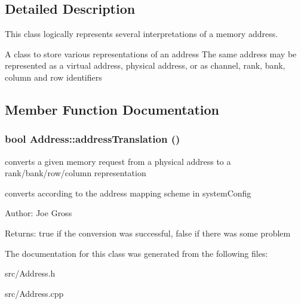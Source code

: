 \subsection{Detailed Description}
This class logically represents several interpretations of a memory address. 

A class to store various representations of an address The same address may be represented as a virtual address, physical address, or as channel, rank, bank, column and row identifiers 

\subsection{Member Function Documentation}
\subsubsection[{addressTranslation}]{\setlength{\rightskip}{0pt plus 5cm}bool Address::addressTranslation ()\hspace{0.3cm}{\tt  [protected]}}\label{class_d_r_a_msim_i_i_1_1_address_d4039f830c5947b91ceb40b8c54503bc}


converts a given memory request from a physical address to a rank/bank/row/column representation 

converts according to the address mapping scheme in systemConfig \begin{Desc}
\item[Author:]Joe Gross \end{Desc}
\begin{Desc}
\item[Returns:]true if the conversion was successful, false if there was some problem \end{Desc}


The documentation for this class was generated from the following files:\begin{CompactItemize}
\item 
src/Address.h\item 
src/Address.cpp\end{CompactItemize}
